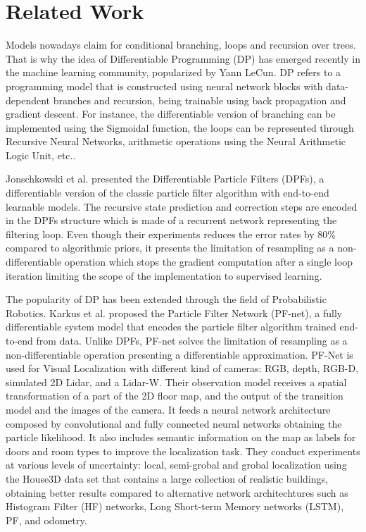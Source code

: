 \section{Related Work}

Models nowadays claim for conditional branching, loops and recursion over trees\cite{inproceedings:ML-ProgrammingLang}. That is why the idea of Differentiable Programming (DP) has emerged recently in the machine learning community, popularized by Yann LeCun\cite{LeCunn:2018}. DP refers to a programming model that is constructed using neural network blocks with data-dependent branches and recursion, being trainable using back propagation and gradient descent\cite{NIPS2018_8221}. For instance, the differentiable version of branching can be implemented using the Sigmoidal function, the loops can be represented through Recursive Neural Networks, arithmetic operations using the Neural Arithmetic Logic Unit, etc.\cite{Scardapane:2019}. 

Jonschkowski et al.\cite{DBLP:journals/corr/abs-1805-11122} presented the Differentiable Particle Filters (DPFs), a differentiable version of the classic particle filter algorithm with end-to-end learnable models. The recursive state prediction and correction steps are encoded in the DPFs structure which is made of a recurrent network representing the filtering loop. Even though their experiments reduces the error rates by 80\% compared to algorithmic priors, it presents the limitation of resampling as a non-differentiable operation which stops the gradient computation after a single loop iteration limiting the scope of the implementation to supervised learning.

The popularity of DP has been extended through the field of Probabilistic Robotics. Karkus et al.\cite{karkus2018particle} proposed the Particle Filter Network (PF-net), a fully differentiable system model that encodes the particle filter algorithm trained end-to-end from data. Unlike DPFs, PF-net  solves the limitation of resampling as a non-differentiable operation presenting a differentiable approximation. PF-Net is used for Visual Localization with different kind of cameras: RGB, depth, RGB-D, simulated 2D Lidar, and a Lidar-W. Their observation model receives a spatial transformation of a part of the 2D floor map, and the output of the transition model and the images of the camera. It feeds a neural network architecture composed by convolutional and fully connected neural networks obtaining the particle likelihood. It also includes semantic information on the map as labels for doors and room types to improve the localization task. They conduct experiments at various levels of uncertainty: local, semi-grobal and grobal localization using the House3D data set\cite{YiHouse3D} that contains a large collection of realistic buildings, obtaining better results compared to alternative network architechtures such as Histogram Filter (HF) networks\cite{Jonschkowski2017EndtoEndLH}, Long Short-term Memory networks (LSTM)\cite{HochreiterLSTM}, PF, and odometry.


